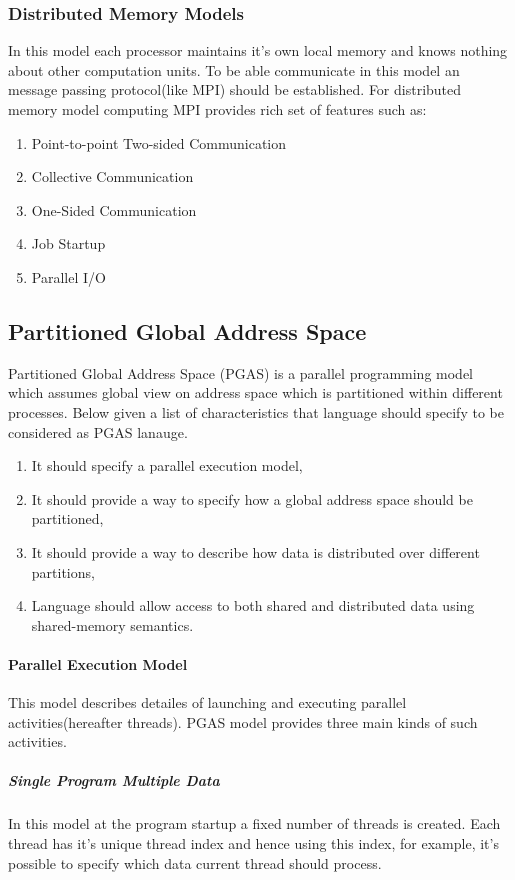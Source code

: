 \documentclass[14pt]{extreport}
\begin{document}
\subsubsection{Distributed Memory Models}
In this model each processor maintains it's own local memory and knows nothing about other computation units.
To be able communicate in this model an message passing protocol(like MPI) should be established. For distributed memory model computing MPI provides rich set of features such as:
\begin{enumerate}
\item Point-to-point Two-sided Communication
\item Collective Communication 
\item One-Sided Communication
\item Job Startup
\item Parallel I/O
\end{enumerate}

\subsection{Partitioned Global Address Space}
Partitioned Global Address Space (PGAS) is a parallel programming model which assumes global view on address space which is partitioned within different processes. Below given a list of characteristics that language should specify to be considered as PGAS lanauge.
\begin{enumerate}
	\item It should specify a parallel execution model,
	\item It should provide a way to specify how a global address space should be partitioned,
	\item It should provide a way to describe how data is distributed over different partitions,
	\item Language should allow access to both shared and distributed data using shared-memory semantics.
\end{enumerate}

\paragraph{Parallel Execution Model}
This model describes detailes of launching and executing parallel activities(hereafter threads). PGAS model provides three main kinds of such activities.

\subparagraph{Single Program Multiple Data}
In this model at the program startup a fixed number of threads is created. Each thread has it's unique thread index and hence using this index, for example, it's possible to specify which data current thread should process.
\end{document}
